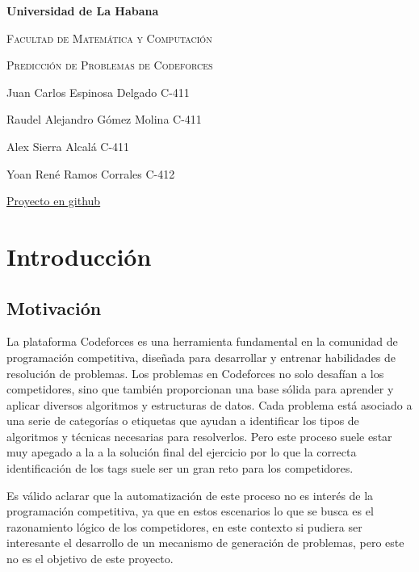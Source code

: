 \documentclass{article}
\begin{document}
\begin{titlepage}
    \centering
    {\bfseries\LARGE Universidad de La Habana \par}
    \vspace{1cm}
    {\scshape\Large Facultad de Matemática y Computación \par}
    \vspace{3cm}
    {\scshape\Huge Predicción de Problemas de Codeforces\par}
    \vfill
    
    {\Large Juan Carlos Espinosa Delgado C-411 \par}
    {\Large Raudel Alejandro Gómez Molina C-411 \par}
    {\Large Alex Sierra Alcalá C-411 \par}
    {\Large Yoan René Ramos Corrales C-412 \par}
    \vfill
    {\href{https://github.com/ARJ-Code/codeforce-tag-predictor}{Proyecto en github} \par}
\end{titlepage}

\section{Introducción}

\subsection{Motivación}

La plataforma Codeforces es una herramienta fundamental en la comunidad de programación competitiva, diseñada
para desarrollar y entrenar habilidades de resolución de problemas. Los problemas en Codeforces no solo desafían
a los competidores, sino que también proporcionan una base sólida para aprender y aplicar diversos algoritmos y
estructuras de datos. Cada problema está asociado a una serie de categorías o etiquetas que ayudan a identificar
los tipos de algoritmos y técnicas necesarias para resolverlos. Pero este proceso suele estar muy apegado a la
a la solución final del ejercicio por lo que la correcta identificación de los tags suele ser un gran reto para los
competidores.

Es válido aclarar que la automatización de este proceso no es interés de la programación competitiva, ya que en estos
escenarios lo que se busca es el razonamiento lógico de los competidores, en este contexto si pudiera ser interesante
el desarrollo de un mecanismo de generación de problemas, pero este no es el objetivo de este proyecto.
\end{document}
